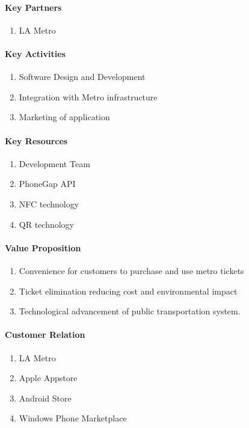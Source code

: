 		\paragraph{Key Partners}\begin{enumerate}
			\item LA Metro
		\end{enumerate}
		
		\paragraph{Key Activities}\begin{enumerate}
			\item Software Design and Development
			\item Integration with Metro  infrastructure
			\item Marketing of application
		\end{enumerate}
		
		\paragraph{Key Resources}\begin{enumerate}
			\item Development Team
			\item PhoneGap API
			\item NFC technology
			\item QR technology
		\end{enumerate}
		
		\paragraph{Value Proposition}\begin{enumerate}
			\item Convenience for customers to purchase and use metro tickets
			\item Ticket elimination reducing cost and environmental impact
			\item Technological advancement of public transportation system. 
 		\end{enumerate}
 		
 		\paragraph{Customer Relation}\begin{enumerate}
 			\item LA Metro
 			\item Apple Appstore
 			\item Android Store
 			\item Windows Phone Marketplace
 		\end{enumerate}

